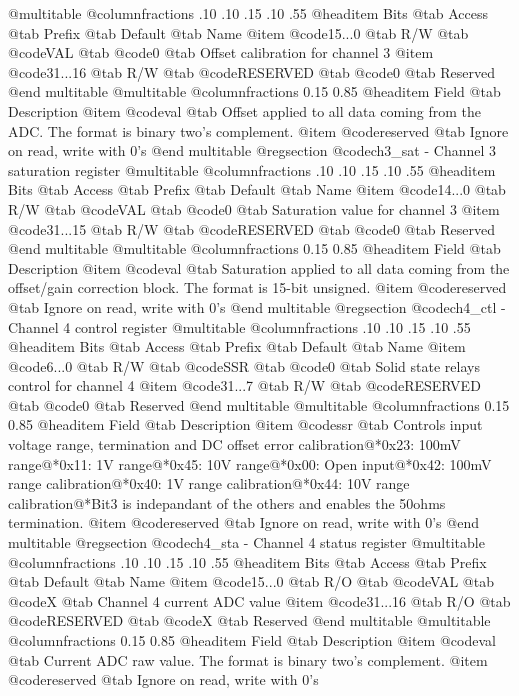@multitable @columnfractions .10 .10 .15 .10 .55
@headitem Bits @tab Access @tab Prefix @tab Default @tab Name
@item @code{15...0}
@tab R/W @tab
@code{VAL}
@tab @code{0} @tab 
Offset calibration for channel 3
@item @code{31...16}
@tab R/W @tab
@code{RESERVED}
@tab @code{0} @tab 
Reserved
@end multitable
@multitable @columnfractions 0.15 0.85
@headitem Field @tab Description
@item @code{val} @tab Offset applied to all data coming from the ADC. The format is binary two's complement.
@item @code{reserved} @tab Ignore on read, write with 0's
@end multitable
@regsection @code{ch3_sat} - Channel 3 saturation register
@multitable @columnfractions .10 .10 .15 .10 .55
@headitem Bits @tab Access @tab Prefix @tab Default @tab Name
@item @code{14...0}
@tab R/W @tab
@code{VAL}
@tab @code{0} @tab 
Saturation value for channel 3
@item @code{31...15}
@tab R/W @tab
@code{RESERVED}
@tab @code{0} @tab 
Reserved
@end multitable
@multitable @columnfractions 0.15 0.85
@headitem Field @tab Description
@item @code{val} @tab Saturation applied to all data coming from the offset/gain correction block. The format is 15-bit unsigned.
@item @code{reserved} @tab Ignore on read, write with 0's
@end multitable
@regsection @code{ch4_ctl} - Channel 4 control register
@multitable @columnfractions .10 .10 .15 .10 .55
@headitem Bits @tab Access @tab Prefix @tab Default @tab Name
@item @code{6...0}
@tab R/W @tab
@code{SSR}
@tab @code{0} @tab 
Solid state relays control for channel 4
@item @code{31...7}
@tab R/W @tab
@code{RESERVED}
@tab @code{0} @tab 
Reserved
@end multitable
@multitable @columnfractions 0.15 0.85
@headitem Field @tab Description
@item @code{ssr} @tab Controls input voltage range, termination and DC offset error calibration@*0x23: 100mV range@*0x11: 1V range@*0x45: 10V range@*0x00: Open input@*0x42: 100mV range calibration@*0x40: 1V range calibration@*0x44: 10V range calibration@*Bit3 is indepandant of the others and enables the 50ohms termination.
@item @code{reserved} @tab Ignore on read, write with 0's
@end multitable
@regsection @code{ch4_sta} - Channel 4 status register
@multitable @columnfractions .10 .10 .15 .10 .55
@headitem Bits @tab Access @tab Prefix @tab Default @tab Name
@item @code{15...0}
@tab R/O @tab
@code{VAL}
@tab @code{X} @tab 
Channel 4 current ADC value
@item @code{31...16}
@tab R/O @tab
@code{RESERVED}
@tab @code{X} @tab 
Reserved
@end multitable
@multitable @columnfractions 0.15 0.85
@headitem Field @tab Description
@item @code{val} @tab Current ADC raw value. The format is binary two's complement.
@item @code{reserved} @tab Ignore on read, write with 0's
